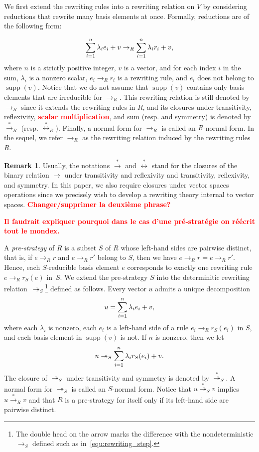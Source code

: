 \documentclass[10pt]{easychair}
\theoremstyle{definition}
\newtheorem{remark}[theorem]{Remark}
\newcommand\todo[1]{{\bf\textcolor{red}{#1}}}
\DeclareMathOperator{\supp}{supp}
\newcommand\rewR{\to_R}
\newcommand\rewS{\twoheadrightarrow_S}
\newcommand\transR{\overset{*}{\to}_R}
\newcommand\transS{\overset{*}{\twoheadrightarrow}_S}
\newcommand\equivR{\overset{*}{\leftrightarrow}_R}
\begin{document}
We first extend the rewriting rules into a rewriting relation on $V$ by
considering reductions that rewrite many basis elements at once.
Formally, reductions are of the following form: 

\begin{equation}\label{equ:rewriting_step}
  \sum_{i=1}^n\lambda_ie_i+v\rewR\sum_{i=1}^n\lambda_ir_i+v,
  \smallskip
\end{equation}
where $n$ is a strictly positive integer, $v$ is a vector, and for each
index $i$ in the sum, $\lambda_i$ is a nonzero scalar, $e_i\rewR r_i$ is
a rewriting rule, and $e_i$ does not belong to $\supp(v)$. Notice that we
do not assume that $\supp(v)$ contains only basis elements that are
irreducible for $\rewR$. This rewriting relation is still denoted by
$\rewR$ since it extends the rewriting rules in $R$, and its closures
under transitivity, reflexivity, \todo{scalar multiplication}, and sum
(resp. and symmetry) is denoted by $\transR$ (resp. $\equivR$). Finally,
a normal form for $\rewR$ is called an $R$-normal form. In the sequel, we
refer $\rewR$ as the rewriting relation induced by the rewriting rules
$R$.
\smallskip

\begin{remark}
  Usually, the notations $\overset{*}{\to}$ and
  $\overset{*}{\leftrightarrow}$
  stand for the closures of the binary relation $\to$ under transitivity
  and reflexivity and transitivity, reflexivity, and symmetry. In this
  paper, we also require closures under vector spaces operations since we
  precisely wish to develop a rewriting theory internal to vector spaces.
  \todo{Changer/supprimer la deuxième phrase?}
\end{remark}
\smallskip

\todo{Il faudrait expliquer pourquoi dans le cas d'une pré-stratégie on
  réécrit tout le mondex.}

A {\em pre-strategy} of $R$ is a subset $S$ of $R$ whose left-hand sides 
are pairwise distinct, that is, if $e\rewR r$ and $e\rewR r'$ belong to
$S$, then we have $e\rewR r=e\rewR r'$. Hence,
each $S$-reducible basis element $e$ corresponds to exactly one rewriting
rule $e\rewR r_S(e)$ in~$S$. We extend the pre-strategy $S$ into the
determinitic rewriting relation~$\rewS$\footnote{The double head on the
  arrow marks the difference with the nondeterministic $\to_S$ defined
  such as in~\eqref{equ:rewriting_step}.} defined as follows. Every
vector $u$ admits a unique decomposition 
\[u=\sum_{i=1}^n\lambda_ie_i+v,
\smallskip\]
where each $\lambda_i$ is nonzero, each $e_i$ is a left-hand side of a
rule $e_i\rewR r_S(e_i)$ in $S$, and each basis element in $\supp(v)$ is
not. If $n$ is nonzero, then we let
\[u\rewS\sum_{i=1}^n\lambda_ir_S(e_i)+v.
\smallskip\]
The closure of $\rewS$ under transitivity and symmetry is denoted by
$\transS$. A normal form for $\rewS$ is called an $S$-normal form. Notice
that $u\transS v$ implies $u\transR v$ and that $R$ is a pre-strategy for
itself only if its left-hand side are pairwise distinct. 
\smallskip
\end{document}
